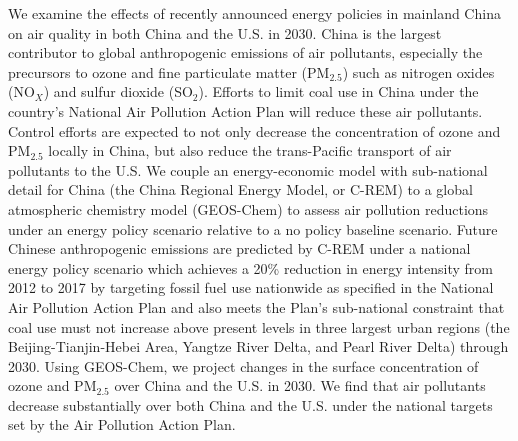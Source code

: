 We examine the effects of recently announced energy policies in mainland China on air quality in both China and the U.S. in 2030. China is the largest contributor to global anthropogenic emissions of air pollutants, especially the precursors to ozone and fine particulate matter (PM$_{2.5}$) such as nitrogen oxides (NO$_X$) and sulfur dioxide (SO$_2$). Efforts to limit coal use in China under the country’s National Air Pollution Action Plan will reduce these air pollutants. Control efforts are expected to not only decrease the concentration of ozone and PM$_{2.5}$ locally in China, but also reduce the trans-Pacific transport of air pollutants to the U.S. We couple an energy-economic model with sub-national detail for China (the China Regional Energy Model, or C-REM) to a global atmospheric chemistry model (GEOS-Chem) to assess air pollution reductions under an energy policy scenario relative to a no policy baseline scenario. Future Chinese anthropogenic emissions are predicted by C-REM under a national energy policy scenario which achieves a 20\% reduction in energy intensity from 2012 to 2017 by targeting fossil fuel use nationwide as specified in the National Air Pollution Action Plan and also meets the Plan’s sub-national constraint that coal use must not increase above present levels in three largest urban regions (the Beijing-Tianjin-Hebei Area, Yangtze River Delta, and Pearl River Delta) through 2030. Using GEOS-Chem, we project changes in the surface concentration of ozone and PM$_{2.5}$ over China and the U.S. in 2030. We find that air pollutants decrease substantially over both China and the U.S. under the national targets set by the Air Pollution Action Plan.
